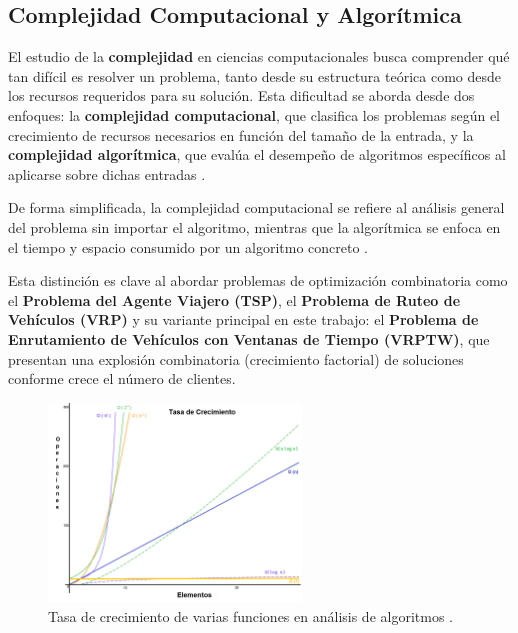 \documentclass[12pt,titlepage,twoside,openright]{book}
\begin{document}
\subsection{Complejidad Computacional y Algorítmica}

El estudio de la \textbf{complejidad} en ciencias computacionales busca comprender qué tan difícil es resolver un problema, tanto desde su estructura teórica como desde los recursos requeridos para su solución. Esta dificultad se aborda desde dos enfoques: la \textbf{complejidad computacional}, que clasifica los problemas según el crecimiento de recursos necesarios en función del tamaño de la entrada, y la \textbf{complejidad algorítmica}, que evalúa el desempeño de algoritmos específicos al aplicarse sobre dichas entradas \citep{garey1979computers, papadimitriou1994}.

De forma simplificada, la complejidad computacional se refiere al análisis general del problema sin importar el algoritmo, mientras que la algorítmica se enfoca en el tiempo y espacio consumido por un algoritmo concreto \citep{maldonado2013problema}.

Esta distinción es clave al abordar problemas de optimización combinatoria como el \textbf{Problema del Agente Viajero (TSP)}, el \textbf{Problema de Ruteo de Vehículos (VRP)} y su variante principal en este trabajo: el \textbf{Problema de Enrutamiento de Vehículos con Ventanas de Tiempo (VRPTW)}, que presentan una explosión combinatoria (crecimiento factorial) de soluciones conforme crece el número de clientes.

\begin{figure}[H]
	\centering
	\includegraphics[width=0.6\textwidth]{Figuras/grafico-complejidad-computacionala3.png}
	\caption{Tasa de crecimiento de varias funciones en análisis de algoritmos \cite{numerentur2019}.}
	\label{fig:figura_complejidad_computacional}
\end{figure}
\end{document}
